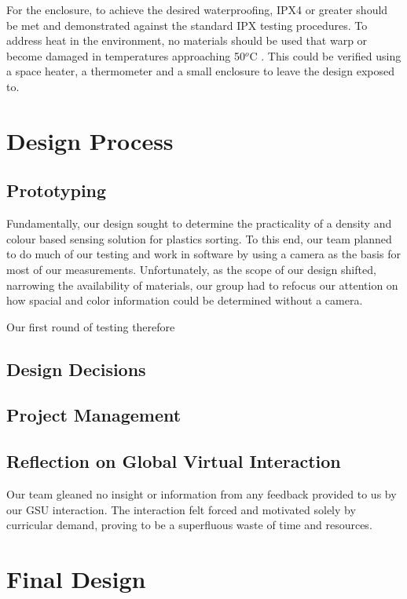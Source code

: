 \documentclass[12pt]{article}
\begin{document}
\begin{multicols*}{2}
            For the enclosure, to achieve the desired waterproofing, IPX4 \cite{gniazdo_2021} or greater should be met and demonstrated against the standard IPX testing procedures. To address heat in the environment, no materials should be used that warp or become damaged in temperatures approaching 50$^o$C \cite{GMET}. This could be verified using a space heater, a thermometer and a small enclosure to leave the design exposed to. 

    \section{Design Process}

        \subsection{Prototyping}
            Fundamentally, our design sought to determine the practicality of a density and colour based sensing solution for plastics sorting. To this end, our team planned to do much of our testing and work in software by using a camera as the basis for most of our measurements. Unfortunately, as the scope of our design shifted, narrowing the availability of materials, our group had to refocus our attention on how spacial and color information could be determined without a camera.

            Our first round of testing therefore

        \subsection{Design Decisions}

        \subsection{Project Management}
            
        \subsection{Reflection on Global Virtual Interaction}
            Our team gleaned no insight or information from any feedback provided to us by our GSU interaction. The interaction felt forced and motivated solely by curricular demand, proving to be a superfluous waste of time and resources.
            
    \section{Final Design}


\end{multicols*}
\end{document}

